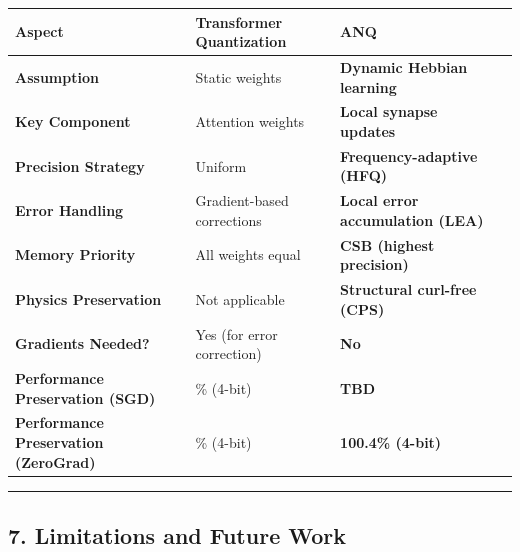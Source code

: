 \documentclass[
  11pt,
  a4paper,
]{article}
\begin{document}
\begin{longtable}[]{@{}
  >{\raggedright\arraybackslash}p{}
  >{\raggedright\arraybackslash}p{}
  >{\raggedright\arraybackslash}p{}
  >{\raggedright\arraybackslash}p{}@{}}
\toprule\noalign{}
\begin{minipage}[b]{\linewidth}\raggedright
Aspect
\end{minipage} & \begin{minipage}[b]{\linewidth}\raggedright
Transformer Quantization
\end{minipage} & \begin{minipage}[b]{\linewidth}\raggedright
\textbf{ANQ}
\end{minipage} & \begin{minipage}[b]{\linewidth}\raggedright
\end{minipage} \\
\midrule\noalign{}
\endhead
\bottomrule\noalign{}
\endlastfoot
\textbf{Assumption} & Static weights & \textbf{Dynamic Hebbian learning}
& \\
\textbf{Key Component} & Attention weights & \textbf{Local synapse
updates} & \\
\textbf{Precision Strategy} & Uniform & \textbf{Frequency-adaptive
(HFQ)} & \\
\textbf{Error Handling} & Gradient-based corrections & \textbf{Local
error accumulation (LEA)} & \\
\textbf{Memory Priority} & All weights equal & \textbf{CSB (highest
precision)} & \\
\textbf{Physics Preservation} & Not applicable & \textbf{Structural
curl-free (CPS)} & \\
\textbf{Gradients Needed?} & Yes (for error correction) & \textbf{No}
& \\
\textbf{Performance Preservation (SGD)} & 30\% (4-bit) & \textbf{TBD}
& \\
\textbf{Performance Preservation (ZeroGrad)} & 97.7\% (4-bit) &
\textbf{100.4\% (4-bit)} & \\
\end{longtable}

\begin{center}\rule{0.5\linewidth}{0.5pt}\end{center}

\subsection{7. Limitations and Future
Work}\label{limitations-and-future-work}
\end{document}
